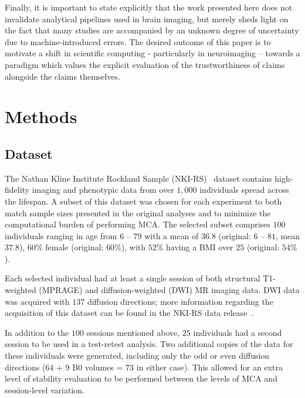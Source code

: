 \documentclass[fleqn,10pt]{SelfArx} %
\begin{document}
Finally, it is important to state explicitly that the work presented here does not invalidate analytical pipelines used
in brain imaging, but merely sheds light on the fact that many studies are accompanied by an unknown degree of
uncertainty due to machine-introduced errors. The desired outcome of this paper is to motivate a shift in scientific
computing - particularly in neuroimaging – towards a paradigm which values the explicit evaluation of the
trustworthiness of claims alongside the claims themselves.
 



\clearpage

\section*{Methods}

\subsection*{Dataset}
The Nathan Kline Institute Rockland Sample (NKI-RS)~\cite{Nooner2012-eg} dataset contains high-fidelity imaging and
phenotypic data from over $1,000$ individuals spread across the lifespan. A subset of this dataset was chosen for each
experiment to both match sample sizes presented in the original analyses and to minimize the computational burden of
performing MCA. The selected subset comprises $100$ individuals ranging in age from $6$ – $79$ with a mean of $36.8$
(original: $6$ – $81$, mean $37.8$), $60\%$ female (original: $60\%$), with $52\%$ having a BMI over $25$ (original:
$54\%$).

Each selected individual had at least a single session of both structural T1-weighted (MPRAGE) and diffusion-weighted
(DWI) MR imaging data. DWI data was acquired with $137$ diffusion directions; more information regarding the
acquisition of this dataset can be found in the NKI-RS data release~\cite{Nooner2012-eg}.

In addition to the $100$ sessions mentioned above, $25$ individuals had a second session to be used in a test-retest
analysis. Two additional copies of the data for these individuals were generated, including only the odd or even
diffusion directions ($64$ + $9$ B0 volumes = $73$ in either case). This allowed for an extra level of stability
evaluation to be performed between the levels of MCA and session-level variation.
\end{document}
